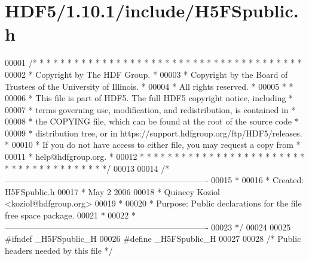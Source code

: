 \hypertarget{_h_d_f5_21_810_81_2include_2_h5_f_spublic_8h_source}{}\section{H\+D\+F5/1.10.1/include/\+H5\+F\+Spublic.h}
\label{_h_d_f5_21_810_81_2include_2_h5_f_spublic_8h_source}

\begin{DoxyCode}
00001 \textcolor{comment}{/* * * * * * * * * * * * * * * * * * * * * * * * * * * * * * * * * * * * * * *}
00002 \textcolor{comment}{ * Copyright by The HDF Group.                                               *}
00003 \textcolor{comment}{ * Copyright by the Board of Trustees of the University of Illinois.         *}
00004 \textcolor{comment}{ * All rights reserved.                                                      *}
00005 \textcolor{comment}{ *                                                                           *}
00006 \textcolor{comment}{ * This file is part of HDF5.  The full HDF5 copyright notice, including     *}
00007 \textcolor{comment}{ * terms governing use, modification, and redistribution, is contained in    *}
00008 \textcolor{comment}{ * the COPYING file, which can be found at the root of the source code       *}
00009 \textcolor{comment}{ * distribution tree, or in https://support.hdfgroup.org/ftp/HDF5/releases.  *}
00010 \textcolor{comment}{ * If you do not have access to either file, you may request a copy from     *}
00011 \textcolor{comment}{ * help@hdfgroup.org.                                                        *}
00012 \textcolor{comment}{ * * * * * * * * * * * * * * * * * * * * * * * * * * * * * * * * * * * * * * */}
00013 
00014 \textcolor{comment}{/*-------------------------------------------------------------------------}
00015 \textcolor{comment}{ *}
00016 \textcolor{comment}{ * Created:             H5FSpublic.h}
00017 \textcolor{comment}{ *                      May  2 2006}
00018 \textcolor{comment}{ *                      Quincey Koziol <koziol@hdfgroup.org>}
00019 \textcolor{comment}{ *}
00020 \textcolor{comment}{ * Purpose:             Public declarations for the file free space package.}
00021 \textcolor{comment}{ *}
00022 \textcolor{comment}{ *-------------------------------------------------------------------------}
00023 \textcolor{comment}{ */}
00024 
00025 \textcolor{preprocessor}{#ifndef \_H5FSpublic\_H}
00026 \textcolor{preprocessor}{#define \_H5FSpublic\_H}
00027 
00028 \textcolor{comment}{/* Public headers needed by this file */}

\end{DoxyCode}
